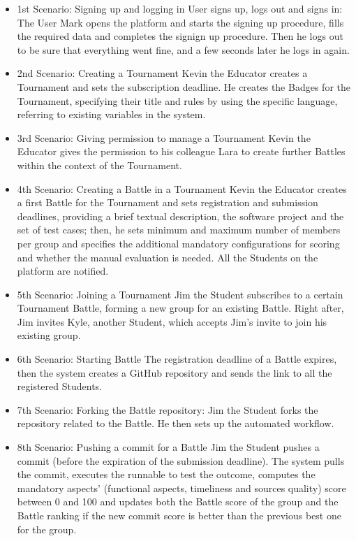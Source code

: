 \documentclass{Configuration_Files/Template}
\begin{document}
\begin{itemize}
\item \textcolor{bluepoli}{1st Scenario: Signing up and logging in} User signs up, logs out and signs in: The User Mark opens the platform and starts the signing up procedure, fills the required data and completes the signign up procedure. Then he logs out to be sure that everything went fine, and a few seconds later he logs in again.
\item \textcolor{bluepoli}{2nd Scenario: Creating a Tournament} Kevin the Educator creates a Tournament and sets the subscription deadline. He creates the Badges for the Tournament, specifying their title and rules by using the specific language, referring to existing variables in the system.
\item \textcolor{bluepoli}{3rd Scenario: Giving permission to manage a Tournament} Kevin the Educator gives the permission to his colleague Lara to create further Battles within the context of the Tournament.
\item \textcolor{bluepoli}{4th Scenario: Creating a Battle in a Tournament} Kevin the Educator creates a first Battle for the Tournament and sets registration and submission deadlines, providing a brief textual description, the software project and the set of test cases; then, he sets minimum and maximum number of members per group and specifies the additional mandatory configurations for scoring and whether the manual evaluation is needed. All the Students on the platform are notified. 
\item \textcolor{bluepoli}{5th Scenario: Joining a Tournament} Jim the Student subscribes to a certain Tournament Battle, forming a new group for an existing Battle. Right after, Jim invites Kyle, another Student, which accepts Jim’s invite to join his existing group.
\item \textcolor{bluepoli}{6th Scenario: Starting Battle} The registration deadline of a Battle expires, then the system creates a GitHub repository and sends the link to all the registered Students.
\item \textcolor{bluepoli}{7th Scenario: Forking the Battle repository}: Jim the Student forks the repository related to the Battle. He then sets up the automated workflow.
\item \textcolor{bluepoli}{8th Scenario: Pushing a commit for a Battle} Jim the Student pushes a commit (before the expiration of the submission deadline). The system pulls the commit, executes the runnable to test the outcome, computes the mandatory aspects’ (functional aspects, timeliness and sources quality) score between 0 and 100 and updates both the Battle score of the group and the Battle ranking if the new commit score is better than the previous best one for the group.

\end{itemize}
\end{document}
